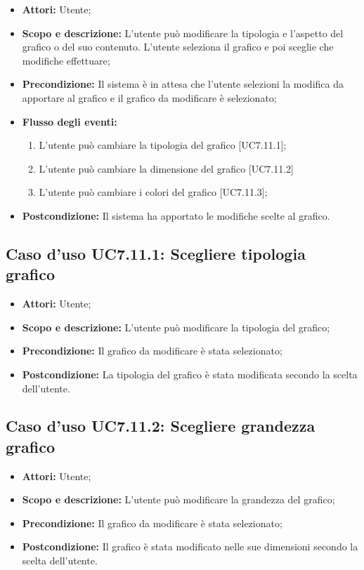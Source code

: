 \begin{itemize}
	\item \textbf{Attori:} Utente;
	\item \textbf{Scopo e descrizione:} L'utente può modificare la tipologia e l'aspetto del grafico o del suo contenuto. L'utente seleziona il grafico e poi sceglie che modifiche effettuare;
	\item \textbf{Precondizione:} Il sistema è in attesa che l'utente selezioni la modifica da apportare al grafico e il grafico da modificare è selezionato;
	\item \textbf{Flusso degli eventi:}
	\begin{enumerate}
		\item L'utente può cambiare la tipologia del grafico [UC7.11.1];
		\item L'utente può cambiare la dimensione del grafico [UC7.11.2]
		\item L'utente può cambiare i colori del grafico [UC7.11.3];
	\end{enumerate}
	\item \textbf{Postcondizione:} Il sistema ha apportato le modifiche scelte al grafico.
\end{itemize}

\subsection{Caso d'uso UC7.11.1: Scegliere tipologia grafico}
\begin{itemize}
	\item \textbf{Attori:} Utente;
	\item \textbf{Scopo e descrizione:} L'utente può modificare la tipologia del grafico;
	\item \textbf{Precondizione:} Il grafico da modificare è stata selezionato;
	\item \textbf{Postcondizione:} La tipologia del grafico è stata modificata secondo la scelta dell'utente.
\end{itemize}

\subsection{Caso d'uso UC7.11.2: Scegliere grandezza grafico}
\begin{itemize}
	\item \textbf{Attori:} Utente;
	\item \textbf{Scopo e descrizione:} L'utente può modificare la grandezza del grafico;
	\item \textbf{Precondizione:} Il grafico da modificare è stata selezionato;
	\item \textbf{Postcondizione:} Il grafico è stata modificato nelle sue dimensioni secondo la scelta dell'utente.
\end{itemize}

